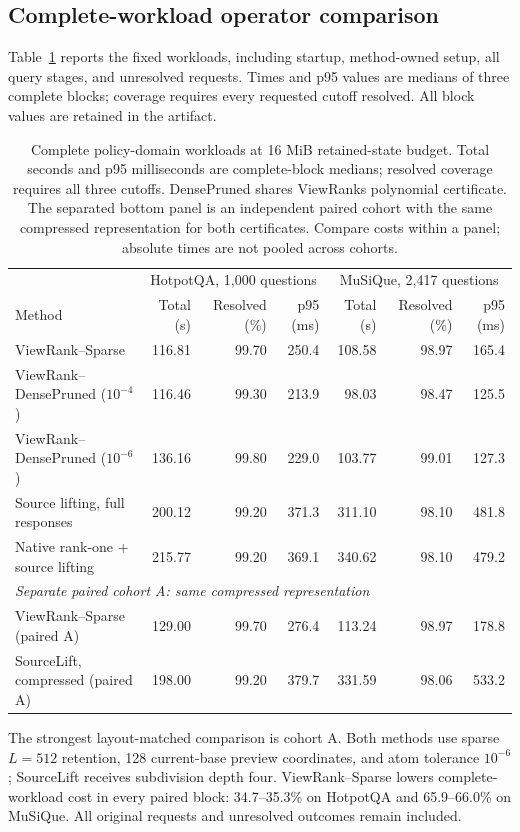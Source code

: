 \subsection{Complete-workload operator comparison}
\label{sec:domain-results}
Table~\ref{tab:domain-main} reports the fixed workloads, including startup, method-owned setup, all query stages, and unresolved requests. Times and p95 values are medians of three complete blocks; coverage requires every requested cutoff resolved. All block values are retained in the artifact.
\begin{table}[t]\centering\small
\caption{Complete policy-domain workloads at 16 MiB retained-state budget. Total seconds and p95 milliseconds are complete-block medians; resolved coverage requires all three cutoffs. DensePruned shares ViewRank\textquotesingle s polynomial certificate. The separated bottom panel is an independent paired cohort with the same compressed representation for both certificates. Compare costs within a panel; absolute times are not pooled across cohorts.}
\label{tab:domain-main}
\begin{tabular}{lrrrrrr}\toprule
& \multicolumn{3}{c}{HotpotQA, 1,000 questions}&\multicolumn{3}{c}{MuSiQue, 2,417 questions}\\
Method & Total (s)&Resolved (\%)&p95 (ms)&Total (s)&Resolved (\%)&p95 (ms)\\\midrule
ViewRank--Sparse & 116.81 & 99.70 & 250.4 & 108.58 & 98.97 & 165.4\\
ViewRank--DensePruned ($10^{-4}$) & 116.46 & 99.30 & 213.9 & 98.03 & 98.47 & 125.5\\
ViewRank--DensePruned ($10^{-6}$) & 136.16 & 99.80 & 229.0 & 103.77 & 99.01 & 127.3\\
Source lifting, full responses & 200.12 & 99.20 & 371.3 & 311.10 & 98.10 & 481.8\\
Native rank-one + source lifting & 215.77 & 99.20 & 369.1 & 340.62 & 98.10 & 479.2\\
\midrule
\multicolumn{7}{l}{\emph{Separate paired cohort A: same compressed representation}}\\
ViewRank--Sparse (paired A) & 129.00 & 99.70 & 276.4 & 113.24 & 98.97 & 178.8\\
SourceLift, compressed (paired A) & 198.00 & 99.20 & 379.7 & 331.59 & 98.06 & 533.2\\
\bottomrule\end{tabular}\end{table}
The strongest layout-matched comparison is cohort A. Both methods use sparse $L=512$ retention, 128 current-base preview coordinates, and atom tolerance $10^{-6}$; SourceLift receives subdivision depth four. ViewRank--Sparse lowers complete-workload cost in every paired block: 34.7--35.3\% on HotpotQA and 65.9--66.0\% on MuSiQue. All original requests and unresolved outcomes remain included.
